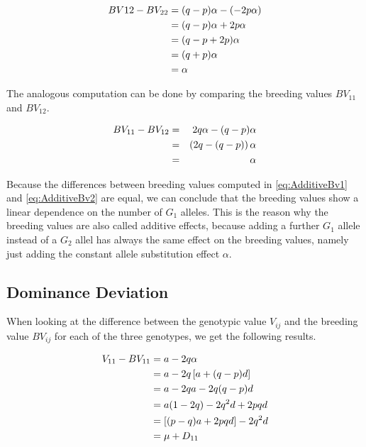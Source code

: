 \documentclass[
]{book}
\theoremstyle{definition}
\theoremstyle{definition}
\theoremstyle{definition}
\theoremstyle{remark}
\begin{document}
\begin{align}
    BV{12} - BV_{22} &=   (q-p)\alpha - \left( -2p\alpha \right)  \notag \\
                      &=   (q-p)\alpha + 2p\alpha \notag \\
                      &=   (q-p+2p)\alpha \notag \\
                      &=   (q+p)\alpha \notag \\
                      &=   \alpha
  \label{eq:AdditiveBv1}
\end{align}

The analogous computation can be done by comparing the breeding values \(BV_{11}\) and \(BV_{12}\).

\begin{align}
    BV_{11} - BV_{12} & = & 2q\alpha - (q-p)\alpha \notag \\
                      & = & \left(2q - (q-p)\right)\alpha \notag\\
                      & = & \alpha 
  \label{eq:AdditiveBv2}
\end{align}

Because the differences between breeding values computed in \eqref{eq:AdditiveBv1} and \eqref{eq:AdditiveBv2} are equal, we can conclude that the breeding values show a linear dependence on the number of \(G_1\) alleles. This is the reason why the breeding values are also called additive effects, because adding a further \(G_1\) allele instead of a \(G_2\) allel has always the same effect on the breeding values, namely just adding the constant allele substitution effect \(\alpha\).

\hypertarget{dominance-deviation}{%
\subsection{Dominance Deviation}\label{dominance-deviation}}

When looking at the difference between the genotypic value \(V_{ij}\) and the breeding value \(BV_{ij}\) for each of the three genotypes, we get the following results.

\begin{align}
  V_{11} - BV_{11} &=   a - 2q \alpha \notag \\
                   &=   a - 2q \left[ a + (q-p)d \right] \notag \\
                   &=   a - 2qa -2q(q-p)d \notag \\
                   &=   a(1-2q) - 2q^2d + 2pqd \notag \\
                   &=   \left[(p - q)a + 2pqd\right] - 2q^2d \notag \\
                   &=   \mu + D_{11} 
  \end{align}
\end{document}
